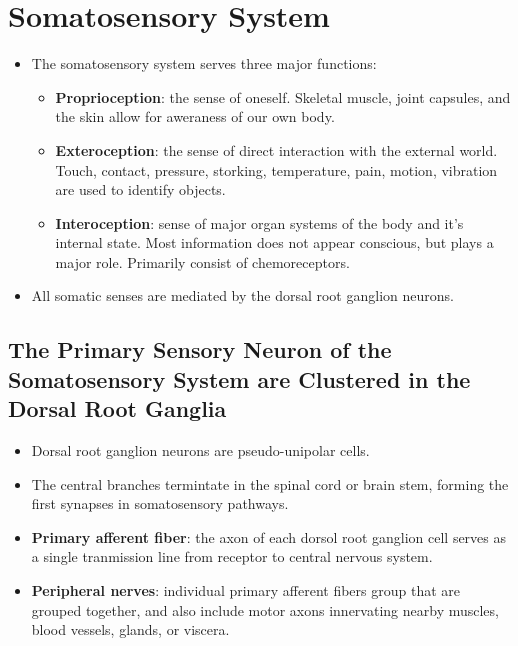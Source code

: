 \documentclass[12pt,a4paper]{article}
\begin{document}
\clearpage
\section{Somatosensory System}
\begin{itemize}
    \item The somatosensory system serves three major functions:
        \begin{itemize}
            \item \textbf{Proprioception}: the sense of oneself. Skeletal muscle, joint capsules, and the skin allow for aweraness of our own body.
            \item \textbf{Exteroception}: the sense of direct interaction with the external world. Touch, contact, pressure, storking, temperature, pain, motion, vibration are used to identify objects.
            \item \textbf{Interoception}: sense of major organ systems of the body and it's internal state. Most information does not appear conscious, but plays a major role. Primarily consist of chemoreceptors.
        \end{itemize}
    \item All somatic senses are mediated by the dorsal root ganglion neurons.
\end{itemize}
\subsection{The Primary Sensory Neuron of the Somatosensory System are Clustered in the Dorsal Root Ganglia}
\begin{itemize}
    \item Dorsal root ganglion neurons are pseudo-unipolar cells.
    \item The central branches termintate in the spinal cord or brain stem, forming the first synapses in somatosensory pathways.
    \item \textbf{Primary afferent fiber}: the axon of each dorsol root ganglion cell serves as a single tranmission line from receptor to central nervous system.
    \item \textbf{Peripheral nerves}: individual primary afferent fibers group that are grouped together, and also include motor axons innervating nearby muscles, blood vessels, glands, or viscera. 
\end{itemize}
\end{document}
